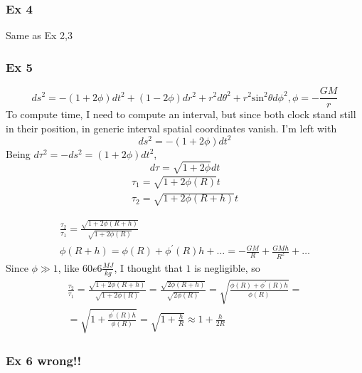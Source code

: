 \subsubsection{Ex 4}
Same as Ex 2,3
\subsubsection{Ex 5}
\[
ds^{2} = -\left( 1+2\phi  \right)dt^{2} +\left( 1-2\phi  \right)dr^{2}+r^{2}d\theta ^{2}+r^{2}\text{sin}^{2}\theta d\phi ^{2}, \phi = - \frac{GM}{r}	
\]
To compute time, I need to compute an interval, but since both clock stand still in their position, in generic interval spatial coordinates vanish. I'm left with
\[
ds^{2} = -\left( 1+2\phi  \right)dt^{2}
\]
Being $d\tau ^{2} =- ds^{2} = \left( 1+2\phi  \right)dt^{2}$,
\[
	d\tau  = \sqrt{1+2\phi }dt
\]
\begin{gather*}
	\tau _{1} = \sqrt{1+2\phi \left( R \right)}t \\
	\tau _{2} = \sqrt{1+2\phi \left( R+h \right)}t
\end{gather*}

\begin{gather*}
	\frac{\tau _{2}}{\tau _{1}} = \frac{\sqrt{1+2\phi\left( R+h \right)}}{\sqrt{1+2\phi \left( R \right)}} \\
\phi \left( R+h \right) = \phi \left( R \right) +\phi ^{\prime }\left( R \right)h +\ldots = - \frac{GM}{R} + \frac{GMh}{R^{2}} +\ldots 	 
\end{gather*}
Since $\phi\gg 1 $, like $60e6 \frac{MJ}{kg}$, I thought that $1$ is negligible, so
\begin{gather*}
\frac{\tau _{2}}{\tau _{1}} = \frac{\sqrt{1+2\phi \left( R+h \right)}}{\sqrt{1+2\phi \left( R \right)}} = \frac{\sqrt{2\phi \left( R+h \right)}}{\sqrt{2\phi \left( R \right)}} = \sqrt{ \frac{\phi \left( R \right) + \phi ^{\prime }\left( R \right)h}{\phi \left( R \right)}} =\\
= \sqrt{ 1+\frac{\phi ^{\prime }\left( R \right)h}{\phi \left( R \right)}} = \sqrt{1 + \frac{h}{R}} \approx 1+ \frac{h}{2R}	 
\end{gather*}
\subsubsection{Ex 6 wrong!!}

